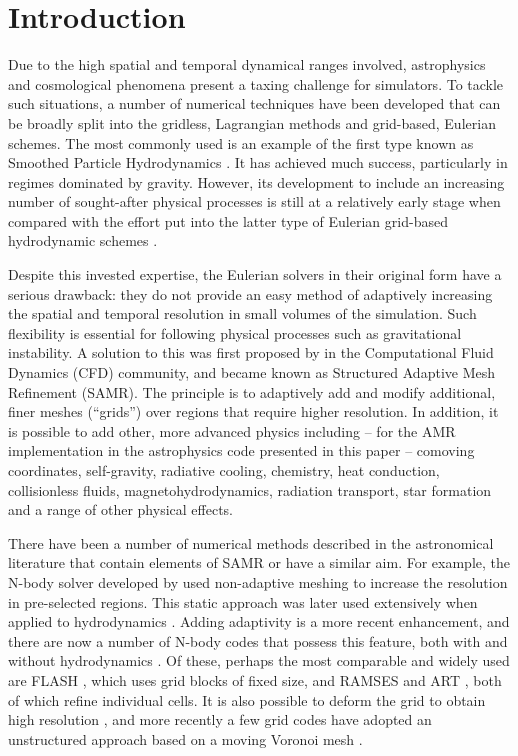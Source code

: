 \section{Introduction}\label{sec.intro}

Due to the high spatial and temporal dynamical ranges involved,
astrophysics and cosmological phenomena present a taxing challenge for
simulators. To tackle such situations, a number of numerical
techniques have been developed that can be broadly split into the
gridless, Lagrangian methods and grid-based, Eulerian schemes. The
most commonly used is an example of the first type known as Smoothed
Particle Hydrodynamics \citep[SPH;][]{Lucy77, SPH}. It has achieved
much success, particularly in regimes dominated by gravity. However,
its development to include an increasing number of sought-after
physical processes is still at a relatively early stage when compared
with the effort put into the latter type of Eulerian grid-based
hydrodynamic schemes \citep[e.g.,][]{laney-1998, toro-1997,
Woodward84}.

Despite this invested expertise, the Eulerian solvers in their
original form have a serious drawback: they do not provide an easy
method of adaptively increasing the spatial and temporal resolution in
small volumes of the simulation. Such flexibility is essential for
following physical processes such as gravitational instability. A
solution to this was first proposed by \citet{Berger89} in the
Computational Fluid Dynamics (CFD) community, and became known as
Structured Adaptive Mesh Refinement (SAMR). The principle is to
adaptively add and modify additional, finer meshes (``grids'') over
regions that require higher resolution. In addition, it is possible to
add other, more advanced physics including -- for the AMR
implementation in the astrophysics code presented in this paper --
comoving coordinates, self-gravity, radiative cooling, chemistry, heat
conduction, collisionless fluids, magnetohydrodynamics, radiation
transport, star formation and a range of other physical effects.


There have been a number of numerical methods described in the
astronomical literature that contain elements of SAMR or have a
similar aim. For example, the N-body solver developed by
\citet{Villumsen89} used non-adaptive meshing to increase the
resolution in pre-selected regions. This static approach was later
used extensively when applied to hydrodynamics
\citep[e.g.,][]{Ruffert94, Anninos94}. Adding adaptivity is a more
recent enhancement, and there are now a number of N-body codes that
possess this feature, both with and without hydrodynamics
\citep{Couchman91, Jessop94, Suisalu95, Splinter96, Gelato97, ART97,
Truelove98, flash_method, MLAPM01, Yahagi01, RAMSES, Quilis04,
Ziegler05, Zhang06, Astrobear09, Pluto-amr, GAMER, Nyx}. Of these,
perhaps the most comparable and widely used are FLASH
\citep{flash_method}, which uses grid blocks of fixed size, and RAMSES
\citep{RAMSES} and ART \citep{ART97}, both of which refine individual
cells. It is also possible to deform the grid to obtain high
resolution \citep[e.g.,][]{Gnedin95, Xu97, Pen98}, and more recently a
few grid codes have adopted an unstructured approach based on a moving
Voronoi mesh \citep{Arepo10, Tess11}.

